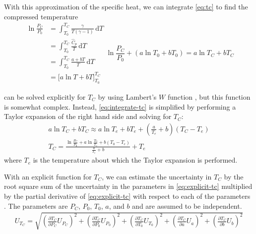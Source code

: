 \documentclass[../main.tex]{subfiles}
\begin{document}
With this approximation of the specific heat, we can integrate \cref{eq:tc}
to find the compressed temperature
%
\begin{subequations}
\begin{align}
\ln{\frac{P_C}{P_0}}
&= \int_{T_0}^{T_{C}} \! \frac{\gamma}{T\left(\gamma-1\right)} \, \mathrm{d} T \\
&= \int_{T_0}^{T_{C}} \! \frac{\hat{C}_p}{T} \, \mathrm{d} T \\
&= \int_{T_0}^{T_{C}} \! \frac{a + b T}{T} \, \mathrm{d} T\\
&= \Big[a \ln{T} + b T \Big]_{T_0}^{T_C}
\end{align}
\begin{equation}
\ln{\frac{P_C}{P_0}} + \left(a \ln{T_0} + b T_0\right) = a \ln{T_C} + b T_C \label{eq:integrate-tc}
\end{equation}
\end{subequations}

 can be solved explicitly for $T_C$ by using
Lambert's $W$ function \cite{Corless1996}, but this function is somewhat
complex. Instead, \cref{eq:integrate-tc} is simplified by performing a
Taylor expansion of the right hand side and solving for $T_C$:
%
\begin{gather}
a \ln{T_C} + b T_C \approx a \ln{T_e} + bT_e + \left(\frac{a}{T_e} + b\right)\left(T_C - T_e\right) \\
T_C = \frac{\ln{\frac{P_C}{P_0}} + a \ln{\frac{T_0}{T_e}} + b\left(T_0 - T_e\right)}{\frac{a}{T_e}+b} + T_e \label{eq:explicit-tc}
\end{gather}
%
where $T_e$ is the temperature about which the Taylor expansion is performed.

With an explicit function for $T_C$, we can estimate the uncertainty in
$T_C$ by the root square sum of the uncertainty in the parameters in
\cref{eq:explicit-tc} multiplied by the partial derivative of
\cref{eq:explicit-tc} with respect to each of the parameters
\cite{Taylor1982}. The parameters are $P_C$, $P_0$, $T_0$, $a$, and $b$
and are assumed to be independent.
%
\begin{align}
\label{eq:tc-unc}
U_{T_C} = \sqrt{\left(\frac{\partial T_C}{\partial P_C} U_{P_C}\right)^2 + \left(\frac{\partial T_C}{\partial P_0} U_{P_0}\right)^2 +
                \left(\frac{\partial T_C}{\partial T_0} U_{T_0}\right)^2 + \left(\frac{\partial T_C}{\partial a} U_{a}\right)^2 +
                \left(\frac{\partial T_C}{\partial b} U_{b}\right)^2}
\end{align}
\end{document}
